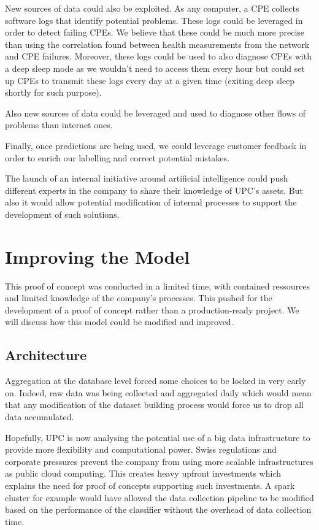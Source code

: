 New sources of data could also be exploited. As any computer, a CPE collects software logs that identify potential problems. These logs could be leveraged in order to detect failing CPEs. We believe that these could be much more precise than using the correlation found between health measurements from the network and CPE failures. Moreover, these logs could be used to also diagnose CPEs with a deep sleep mode as we wouldn't need to access them every hour but could set up CPEs to transmit these logs every day at a given time (exiting deep sleep shortly for such purpose).

Also new sources of data could be leveraged and used to diagnose other flows of problems than internet ones. 

Finally, once predictions are being used, we could leverage customer feedback in order to enrich our labelling and correct potential mistakes. 

\vspace{\baselineskip}
The launch of an internal initiative around artificial intelligence could push different experts in the company to share their knowledge of UPC's assets. But also it would allow potential modification of internal processes to support the development of such solutions.


\section{Improving the Model}
This proof of concept was conducted in a limited time, with contained ressources and limited knowledge of the company's processes. This pushed for the development of a proof of concept rather than a production-ready project. We will discuss how this model could be modified and improved.

\subsection{Architecture}
Aggregation at the database level forced some choices to be locked in very early on. Indeed, raw data was being collected and aggregated daily which would mean that any modification of the dataset building process would force us to drop all data accumulated. 

Hopefully, UPC is now analysing the potential use of a big data infrastructure to provide more flexibility and computational power. Swiss regulations and corporate pressures prevent the company from using more scalable infrastructures as public cloud computing. This creates heavy upfront investments which explains the need for proof of concepts supporting such investments. A spark cluster for example would have allowed the data collection pipeline to be modified based on the performance of the classifier without the overhead of data collection time. 

